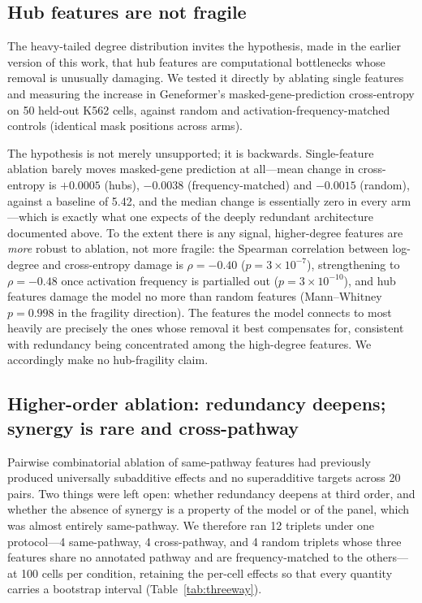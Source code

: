 \documentclass[11pt,onecolumn]{article}
\begin{document}
\subsection{Hub features are not fragile}

The heavy-tailed degree distribution invites the hypothesis, made in the earlier version of this work, that hub features are computational bottlenecks whose removal is unusually damaging. We tested it directly by ablating single features and measuring the increase in Geneformer's masked-gene-prediction cross-entropy on 50 held-out K562 cells, against random and activation-frequency-matched controls (identical mask positions across arms).

The hypothesis is not merely unsupported; it is backwards. Single-feature ablation barely moves masked-gene prediction at all---mean change in cross-entropy is $+0.0005$ (hubs), $-0.0038$ (frequency-matched) and $-0.0015$ (random), against a baseline of 5.42, and the median change is essentially zero in every arm---which is exactly what one expects of the deeply redundant architecture documented above. To the extent there is any signal, higher-degree features are \emph{more} robust to ablation, not more fragile: the Spearman correlation between log-degree and cross-entropy damage is $\rho=-0.40$ ($p=3\times10^{-7}$), strengthening to $\rho=-0.48$ once activation frequency is partialled out ($p=3\times10^{-10}$), and hub features damage the model no more than random features (Mann--Whitney $p=0.998$ in the fragility direction). The features the model connects to most heavily are precisely the ones whose removal it best compensates for, consistent with redundancy being concentrated among the high-degree features. We accordingly make no hub-fragility claim.

\subsection{Higher-order ablation: redundancy deepens; synergy is rare and cross-pathway}

Pairwise combinatorial ablation of same-pathway features had previously produced universally subadditive effects and no superadditive targets across 20 pairs. Two things were left open: whether redundancy deepens at third order, and whether the absence of synergy is a property of the model or of the panel, which was almost entirely same-pathway. We therefore ran 12 triplets under one protocol---4 same-pathway, 4 cross-pathway, and 4 random triplets whose three features share no annotated pathway and are frequency-matched to the others---at 100 cells per condition, retaining the per-cell effects so that every quantity carries a bootstrap interval (Table~\ref{tab:threeway}).
\end{document}
